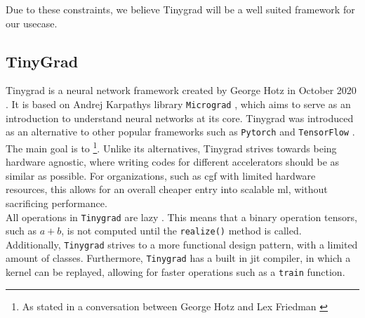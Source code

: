 Due to these constraints, we believe Tinygrad \cite{tinygrad} will be a well suited framework for our usecase.

\subsection{TinyGrad}

Tinygrad is a neural network framework created by George Hotz in October 2020 \cite{tinygrad2020}. It is based on Andrej Karpathys library \texttt{Micrograd} \cite{micrograd}, which aims to serve as an introduction to understand neural networks at its core. Tinygrad was introduced as an alternative to other popular frameworks such as \texttt{Pytorch} \cite{paszke2019pytorch} and \texttt{TensorFlow} \cite{abadi2016tensorflow}. The main goal is to  \footnote{As stated in a conversation between George Hotz and Lex Friedman \cite{LexClipsYouTube2023}}. Unlike its alternatives, Tinygrad strives towards being hardware agnostic, where writing codes for different accelerators should be as similar as possible. For organizations, such as \acrshort{cgf} with limited hardware resources, this allows for an overall cheaper entry into scalable \acrshort{ml}, without sacrificing performance. \\

All operations in \texttt{Tinygrad} are lazy \cite{tinygrad}. This means that a binary operation tensors, such as $a+b$, is not computed until the \texttt{realize()} method is called. Additionally, \texttt{Tinygrad} strives to a more functional design pattern, with a limited amount of classes. Furthermore, \texttt{Tinygrad} has a built in \acrfull{jit} compiler, in which a kernel can be replayed, allowing for faster operations such as a \texttt{train} function. \\









